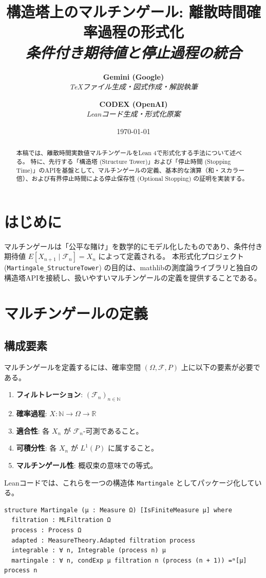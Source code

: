 \documentclass[a4paper,11pt]{article}
\title{構造塔上のマルチンゲール: 離散時間確率過程の形式化\\
\large \textit{条件付き期待値と停止過程の統合}}
\author{
  \textbf{Gemini (Google)} \\
  \small \textit{TeXファイル生成・図式作成・解説執筆}
  \and
  \textbf{CODEX (OpenAI)} \\
  \small \textit{Leanコード生成・形式化原案}
}
\date{\today}
\theoremstyle{definition}
\theoremstyle{plain}
\begin{document}
\maketitle

\begin{abstract}
本稿では、離散時間実数値マルチンゲールをLean 4で形式化する手法について述べる。
特に、先行する「構造塔 (Structure Tower)」および「停止時間 (Stopping Time)」のAPIを基盤として、マルチンゲールの定義、基本的な演算（和・スカラー倍）、および有界停止時間による停止保存性 (Optional Stopping) の証明を実装する。
\end{abstract}

\tableofcontents

\section{はじめに}
マルチンゲールは「公平な賭け」を数学的にモデル化したものであり、条件付き期待値 $E[X_{n+1} \mid \mathcal{F}_n] = X_n$ によって定義される。
本形式化プロジェクト (\texttt{Martingale\_StructureTower}) の目的は、mathlibの測度論ライブラリと独自の構造塔APIを接続し、扱いやすいマルチンゲールの定義を提供することである。

\section{マルチンゲールの定義}

\subsection{構成要素}
マルチンゲールを定義するには、確率空間 $(\Omega, \mathcal{F}, P)$ 上に以下の要素が必要である。
\begin{enumerate}
    \item \textbf{フィルトレーション}: $(\mathcal{F}_n)_{n \in \mathbb{N}}$
    \item \textbf{確率過程}: $X : \mathbb{N} \to \Omega \to \mathbb{R}$
    \item \textbf{適合性}: 各 $X_n$ が $\mathcal{F}_n$-可測であること。
    \item \textbf{可積分性}: 各 $X_n$ が $L^1(P)$ に属すること。
    \item \textbf{マルチンゲール性}: 概収束の意味での等式。
\end{enumerate}

Leanコードでは、これらを一つの構造体 \texttt{Martingale} としてパッケージ化している。

\begin{lstlisting}[caption=マルチンゲールの構造体定義]
structure Martingale (μ : Measure Ω) [IsFiniteMeasure μ] where
  filtration : MLFiltration Ω
  process : Process Ω
  adapted : MeasureTheory.Adapted filtration process
  integrable : ∀ n, Integrable (process n) μ
  martingale : ∀ n, condExp μ filtration n (process (n + 1)) =ᵐ[μ] process n
\end{lstlisting}
\end{document}
